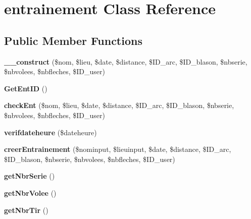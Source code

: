 \hypertarget{classentrainement}{}\section{entrainement Class Reference}
\label{classentrainement}
\subsection*{Public Member Functions}
\begin{DoxyCompactItemize}
\item 
\mbox{\label{classentrainement_ae52b8a5c77805599d4e0ca42c306a3f7}} 
{\bfseries \+\_\+\+\_\+construct} (\$nom, \$lieu, \$date, \$distance, \$I\+D\+\_\+arc, \$I\+D\+\_\+blason, \$nbserie, \$nbvolees, \$nbfleches, \$I\+D\+\_\+user)
\item 
\mbox{\label{classentrainement_aba3b5e9e9d366fe4b93b7e32c2f3b74f}} 
{\bfseries Get\+Ent\+ID} ()
\item 
\mbox{\label{classentrainement_ab6a177174e7b2d1304bc5ba8f95d64cc}} 
{\bfseries check\+Ent} (\$nom, \$lieu, \$date, \$distance, \$I\+D\+\_\+arc, \$I\+D\+\_\+blason, \$nbserie, \$nbvolees, \$nbfleches, \$I\+D\+\_\+user)
\item 
\mbox{\label{classentrainement_a4b0681cb05b5f7698173a309b80ec39c}} 
{\bfseries verifdateheure} (\$dateheure)
\item 
\mbox{\label{classentrainement_a757b3b0b1570d9862062db2d4af9515d}} 
{\bfseries creer\+Entrainement} (\$nominput, \$lieuinput, \$date, \$distance, \$I\+D\+\_\+arc, \$I\+D\+\_\+blason, \$nbserie, \$nbvolees, \$nbfleches, \$I\+D\+\_\+user)
\item 
\mbox{\label{classentrainement_aa2cc16da1c7cd0ec8b106aedec9705c3}} 
{\bfseries get\+Nbr\+Serie} ()
\item 
\mbox{\label{classentrainement_a9dd9781cd33277401c1e3256928eba9b}} 
{\bfseries get\+Nbr\+Volee} ()
\item 
\mbox{\label{classentrainement_a8ffc8c0d8f8e358ba1467e3cd78e5bdb}} 
{\bfseries get\+Nbr\+Tir} ()
\end{DoxyCompactItemize}
